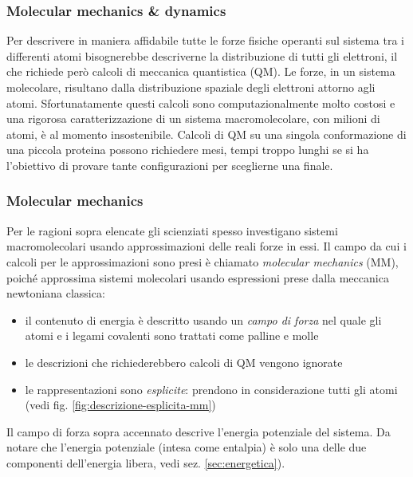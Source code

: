 {{\subsubsection{Molecular mechanics \& dynamics}

\par Per descrivere in maniera affidabile tutte le forze fisiche operanti sul sistema tra i differenti atomi bisognerebbe descriverne la distribuzione di tutti gli elettroni, il che richiede però calcoli di meccanica quantistica (QM). Le forze, in un sistema molecolare, risultano dalla distribuzione spaziale degli elettroni attorno agli atomi. Sfortunatamente questi calcoli sono computazionalmente molto costosi e una rigorosa caratterizzazione di un sistema macromolecolare, con milioni di atomi, è al momento insostenibile. Calcoli di QM su una singola conformazione di una piccola proteina possono richiedere mesi, tempi troppo lunghi se si ha l'obiettivo di provare tante configurazioni per sceglierne una finale. 

\subsubsection{Molecular mechanics}

\par Per le ragioni sopra elencate gli scienziati spesso investigano sistemi macromolecolari usando approssimazioni delle reali forze in essi. Il campo da cui i calcoli per le approssimazioni sono presi è chiamato \textit{molecular mechanics} (MM), poiché approssima sistemi molecolari usando espressioni prese dalla meccanica newtoniana classica:
\begin{itemize}
	\item il contenuto di energia è descritto usando un \textit{campo di forza} nel quale gli atomi e i legami covalenti sono trattati come palline e molle
	\item le descrizioni che richiederebbero calcoli di QM vengono ignorate
	\item le rappresentazioni sono \textit{esplicite}: prendono in considerazione tutti gli atomi (vedi fig. \ref{fig:descrizione-esplicita-mm})
\end{itemize}

Il campo di forza sopra accennato descrive l'energia potenziale del sistema. Da notare che l'energia potenziale (intesa come entalpia) è solo una delle due componenti dell'energia libera, vedi sez. \ref{sec:energetica}).

}}

